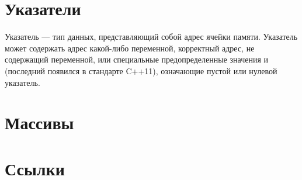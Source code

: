 \documentclass[book.tex]{subfiles}
\begin{document}



\maketitle

\section*{Указатели}


Указатель --- тип данных, представляющий собой адрес ячейки памяти. Указатель может содержать адрес какой-либо переменной, корректный адрес, не содержащий переменной, или специальные предопределенные значения  и  (последний появился в стандарте C++11), означающие пустой или нулевой указатель.

\section*{Массивы}

\section*{Ссылки}
\end{document}
